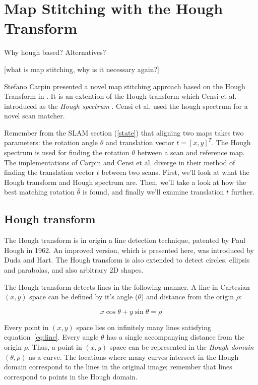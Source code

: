 
\chapter{Map Stitching with the Hough Transform}
Why hough based?
Alternatives?

[what is map stitching, why is it necessary again?]

Stefano Carpin presented a novel map stitching approach based on the Hough Transform in \cite{carpin2002merging}. It is an extention of the Hough transform which Censi et al. introduced as the \emph{Hough spectrum} \cite{censi2005scan}. Censi et al. used the hough spectrum for a novel scan matcher. 

Remember from the SLAM section (\ref{state}) that aligning two maps takes two parameters: the rotation angle $\theta$ and translation vector $t = [x, y]^T$. The Hough spectrum is used for finding the rotation $\theta$ between a scan and reference map. The implementations of Carpin and Censi et al. diverge in their method of finding the translation vector $t$ between two scans. First, we'll look at what the Hough transform and Hough spectrum are. Then, we'll take a look at how the best matching rotation $\hat\theta$ is found, and finally we'll examine translation $t$ further.

\section{Hough transform}
The Hough transform is in origin a line detection technique, patented by Paul Hough in 1962\cite{hough1962method}. An improved version, which is presented here, was introduced by Duda and Hart\cite{duda1972use}. The Hough transform is also extended to detect circles, ellipsis and parabolas, and also arbitrary 2D shapes\cite{ballard1981generalizing}.

The Hough transform detects lines in the following manner. A line in Cartesian $(x, y)$ space can be defined by it's angle ($\theta$) and distance from the origin $\rho$:

\begin{equation}
\label{eq:line}
x\cos \theta + y\sin \theta = \rho
\end{equation}

Every point in $(x,y)$ space lies on infinitely many lines satisfying equation~\ref{eq:line}. Every angle $\theta$ has a single accompanying distance from the origin $\rho$. Thus, a point in $(x,y)$ space can be represented in the \emph{Hough domain} $(\theta, \rho)$ as a curve. The locations where many curves intersect in the Hough domain correspond to the lines in the original image; remember that lines correspond to points in the Hough domain. 


